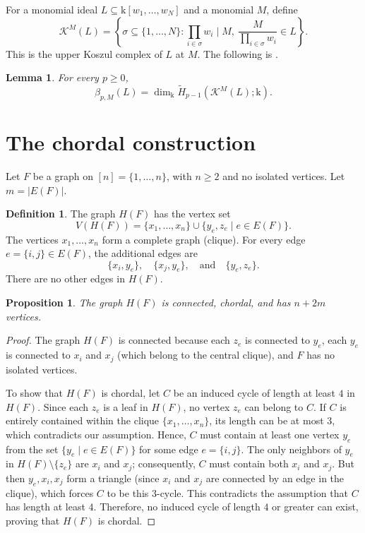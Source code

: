\documentclass[12pt]{amsart}
\newtheorem{proposition}[theorem]{Proposition}
\newtheorem{lemma}[theorem]{Lemma}
\theoremstyle{definition}
\newtheorem{definition}[theorem]{Definition}
\theoremstyle{remark}
\newcommand{\kk}{\mathrm{k}}
\newcommand{\Htilde}{\widetilde H}
\begin{document}
For a monomial ideal $L\subseteq\kk[w_1,\ldots,w_N]$ and a monomial $M$,
define
\[
\mathcal K^M(L)=
\left\{\sigma\subseteq\{1,\ldots,N\}:
 \prod_{i\in\sigma}w_i\mid M,\
 \frac{M}{\prod_{i\in\sigma}w_i}\in L\right\}.
\]
This is the upper Koszul complex of $L$ at $M$. The following is \cite[Theorem~2.2]{BCP}.

\begin{lemma}\label{lem:koszul}
For every $p\ge0$,
\[
\beta_{p,M}(L)=
\dim_{\kk}\Htilde_{p-1}(\mathcal K^M(L);\kk).
\]
\end{lemma}

\section{The chordal construction}\label{sec:construction}

Let $F$ be a graph on $[n] = \{1, \ldots, n\}$, with $n \ge 2$ and no isolated vertices. Let $m = |E(F)|$.

\begin{definition}\label{def:construction}
The graph $H(F)$ has the vertex set
\[
V(H(F)) = \{x_1, \ldots, x_n\} \cup \{y_e, z_e \mid e \in E(F)\}.
\]
The vertices $x_1, \ldots, x_n$ form a complete graph (clique). For every edge $e = \{i, j\} \in E(F)$, the additional edges are
\[
\{x_i, y_e\}, \quad \{x_j, y_e\}, \quad \text{and} \quad \{y_e, z_e\}.
\]
There are no other edges in $H(F)$.
\end{definition}

\begin{proposition}\label{prop:chordal}
The graph $H(F)$ is connected, chordal, and has $n + 2m$ vertices.
\end{proposition}

\begin{proof}
The graph $H(F)$ is connected because each $z_e$ is connected to $y_e$, each $y_e$ is connected to $x_i$ and $x_j$ (which belong to the central clique), and $F$ has no isolated vertices. 

To show that $H(F)$ is chordal, let $C$ be an induced cycle of length at least $4$ in $H(F)$. Since each $z_e$ is a leaf in $H(F)$, no vertex $z_e$ can belong to $C$. If $C$ is entirely contained within the clique $\{x_1, \ldots, x_n\}$, its length can be at most $3$, which contradicts our assumption. Hence, $C$ must contain at least one vertex $y_e$ from the set $\{y_e \mid e \in E(F)\}$ for some edge $e = \{i, j\}$. The only neighbors of $y_e$ in $H(F) \setminus \{z_e\}$ are $x_i$ and $x_j$; consequently, $C$ must contain both $x_i$ and $x_j$. But then $y_e, x_i, x_j$ form a triangle (since $x_i$ and $x_j$ are connected by an edge in the clique), which forces $C$ to be this $3$-cycle. This contradicts the assumption that $C$ has length at least $4$. Therefore, no induced cycle of length $4$ or greater can exist, proving that $H(F)$ is chordal.
\end{proof}
\end{document}
